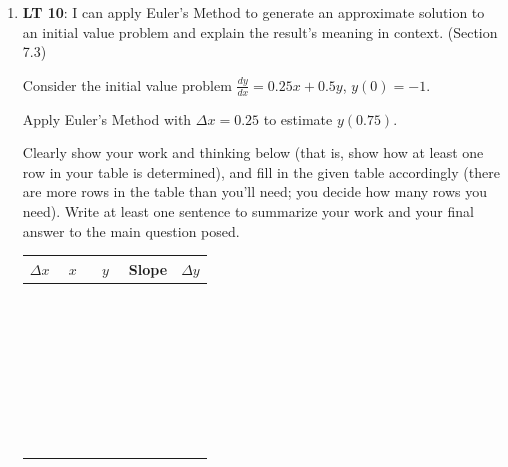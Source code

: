 \documentclass[11 pt]{article}
\newcommand{\be}{\begin{enumerate}}
\newcommand{\ee}{\end{enumerate}}
\begin{document}
\begin{enumerate}
	
	\be
		\item $\frac{dM}{dt} = 0.1M - 10$, $M(t) = 100 + 5e^{0.1t}$

	
		\item $\frac{dQ}{dt} = -4Q$, $Q(t) = \sin(4t)$
		
		
		\item $\frac{dy}{dt} = -4t$, $y(t) = -2t^2 + 11$
		
		
		\item $\frac{dP}{dt} = -0.05 P (20 - P)$, $P(t) = 20$
		
		

	\ee


\item[10.] {\bf LT 10}:  I can apply Euler’s Method to generate an approximate solution to an initial value problem and explain the result’s meaning in context. (Section 7.3)

Consider the initial value problem $\frac{dy}{dx} = 0.25x + 0.5y$, $y(0) = -1$.

Apply Euler's Method with $\Delta x = 0.25$ to estimate $y(0.75)$.  

Clearly show your work and thinking below (that is, show how at least one row in your table is determined), and fill in the given table accordingly (there are more rows in the table than you'll need; you decide how many rows you need).  Write at least one sentence to summarize your work and your final answer to the main question posed.


\begin{center}
\begin{tabular}{|c|c|c|c|c|}
\hline
$\Delta x$ & $x$ & $y$ &  Slope   &  $\Delta y$ \\
\hline
  \ \hspace{0.5in} \ & \ \hspace{0.5in} \  & \ \hspace{0.5in} \  & \  \hspace{0.5in} \ & \  \hspace{0.5in} \ \\   \hline  
  \ & \ & \ & \ & \ \\ \hline
    \ & \ & \ & \ & \ \\  \hline
  \ & \ & \ & \ & \ \\  \hline
   \ & \ & \ & \ & \ \\   \hline
   \ & \ & \ & \ & \ \\   \hline   
   \ & \ & \ & \ & \ \\  
\hline
\end{tabular}
\end{center}



\end{enumerate}
\end{document}
